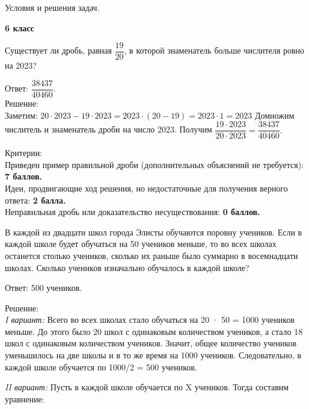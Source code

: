 \centerline{\Huge Условия и решения задач.}
\centerline{\bf \Huge 6 класс}
 
Существует ли дробь, равная $\dfrac{19}{20}$, в которой знаменатель больше числителя ровно на 2023?

\hspace{3mm}

Ответ: $\dfrac{38437}{40460}$.\\

Решение:\\
Заметим: $20\cdot2023 - 19\cdot2023 = 2023\cdot(20-19) = 2023\cdot1 = 2023 $
Домножим числитель и знаменатель дроби на число 2023. Получим $\dfrac{19\cdot2023}{20\cdot2023} = \dfrac{38437}{40460}.$

\hspace{3mm}

Критерии:\\
Приведен пример правильной дроби (дополнительных объяснений не требуется): \textbf{7 баллов.}\\
Идеи, продвигающие ход решения, но недостаточные для получения верного ответа: \textbf{2 балла.}\\
Неправильная дробь или доказательство несуществования: \textbf{0 баллов.}

\hspace{3mm}

В каждой из двадцати школ города Элисты обучаются поровну учеников. Если в каждой школе будет обучаться на 50 учеников меньше, то во всех школах останется столько учеников, сколько их раньше было суммарно в восемнадцати школах. Сколько учеников изначально обучалось в каждой школе? 

\hspace{3mm}

Ответ: 500 учеников.

Решение:\\
\textit{I вариант:} Всего во всех школах стало обучаться на 20 · 50 = 1000 учеников меньше. До этого было 20 школ с одинаковым количеством учеников, а стало 18 школ с одинаковым количеством учеников. Значит, общее количество учеников уменьшилось на две школы и в то же время на 1000 учеников.
Следовательно, в каждой школе обучается по 1000/2 = 500 учеников.

\textit{II вариант:} Пусть в каждой школе обучается по X учеников. Тогда составим уравнение:

\newpage

\hspace{3mm}

